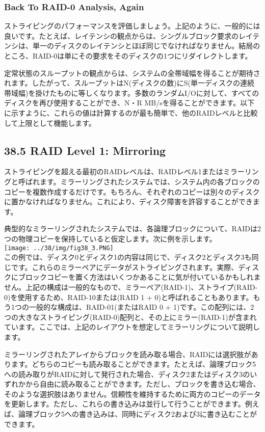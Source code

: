 \hypertarget{back-to-raid-0-analysis-again}{%
\subsubsection*{Back To RAID-0 Analysis,
Again}\label{back-to-raid-0-analysis-again}}

ストライピングのパフォーマンスを評価しましょう。上記のように、一般的には良いです。たとえば、レイテンシの観点からは、シングルブロック要求のレイテンシは、単一のディスクのレイテンシとほぼ同じでなければなりません。結局のところ、RAID-0は単にその要求をそのディスクの1つにリダイレクトします。

定常状態のスループットの観点からは、システムの全帯域幅を得ることが期待されます。したがって、スループットはN(ディスクの数)にS(単一ディスクの連続帯域幅)を掛けたものに等しくなります。多数のランダムI/Oに対して、すべてのディスクを再び使用することができ、N・R
MB/sを得ることができます。以下に示すように、これらの値は計算するのが最も簡単で、他のRAIDレベルと比較して上限として機能します。

\hypertarget{raid-level-1-mirroring}{%
\subsection*{38.5 RAID Level 1: Mirroring}\label{raid-level-1-mirroring}}

ストライピングを超える最初のRAIDレベルは、RAIDレベル1またはミラーリングと呼ばれます。ミラーリングされたシステムでは、システム内の各ブロックのコピーを複数作成するだけです。もちろん、それぞれのコピーは別々のディスクに置かなければなりません。これにより、ディスク障害を許容することができます。

典型的なミラーリングされたシステムでは、各論理ブロックについて、RAIDは2つの物理コピーを保持していると仮定します。次に例を示します。\\
\texttt{[image: ../38/img/fig38\_3.PNG]}\\
この例では、ディスク0とディスク1の内容は同じで、ディスク2とディスク3も同じです。これらのミラーペアにデータがストライピングされます。実際、ディスクにブロックコピーを置く方法はいくつかあることに気が付いているかもしれません。上記の構成は一般的なもので、ミラーペア(RAID-1)、ストライプ(RAID-0)を使用するため、RAID-10または(RAID
1 +
0)と呼ばれることもあります。もう1つの一般的な構成は、RAID-01(またはRAID
0 +
1)です。この配列には、2つの大きなストライピング(RAID-0)配列と、その上にミラー(RAID-1)が含まれています。ここでは、上記のレイアウトを想定してミラーリングについて説明します。

ミラーリングされたアレイからブロックを読み取る場合、RAIDには選択肢があります。どちらのコピーも読み取ることができます。たとえば、論理ブロック5への読み取りがRAIDに対して発行された場合、ディスク2またはディスク3のいずれかから自由に読み取ることができます。ただし、ブロックを書き込む場合、そのような選択肢はありません。信頼性を維持するために両方のコピーのデータを更新します。ただし、これらの書き込みは並行して行うことができます。例えば、論理ブロック5への書き込みは、同時にディスク2および3に書き込むことができます。

